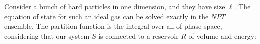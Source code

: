 \documentclass[12pt]{article}
\begin{document}
\newcommand{\pder}[2]{\frac{\partial {#1}}{\partial {#2}}}
\newcommand{\pdert}[2]{\frac{\partial^2 {#1}}{\partial {#2}^2}}
\newcommand{\fder}[2]{\frac{\delta {#1}}{\delta {#2}}}
\newcommand{\PDD}[3]{\left.\frac{\partial^{2}{#1}}{\partial{#2}^{2}}\right|_{#3}
}
\newcommand{\PD}[3]{\left.\frac{\partial{#1}}{\partial{#2}}\right|_{#3}}
\newcommand{\der}[2]{\frac{d {#1}}{d {#2}}}

\renewcommand{\deg}{^\circ}
\newcommand{\com}{{\bf [C] }}
\newcommand{\cend}{\Emark\[\]\vspace*{-1. cm}}
\newcommand{\x}{\times}

\newcommand{\win}{\ddot\smile}
\newcommand{\lose}{\ddot\frown}
\newcommand{\avg}[1]{\left \langle #1 \right \rangle}
\newcommand{\E}[1]{\ensuremath{\times10^{#1}}}
\newcommand{\abs}[1]{\ensuremath{\left | #1 \right |}}
\newcommand{\paren}[1]{\left(#1\right)}
\newcommand{\recip}[1]{\frac{1}{#1}}
\newcommand{\ex}[1]{\mathbb{E}[#1]}
\newcommand{\bprob}[1]{\textbf{#1~---}}
\newcommand{\unitv}[1]{\ensuremath{\mathbf{\hat{e}}_{#1}}}
\newcommand{\goto}{\rightarrow}
\newcommand{\expct}[1]{\mathbb{E}[#1]}
\newcommand{\mtrx}[1]{\begin{matrix}#1\end{matrix}}
\newcommand{\pmtrx}[1]{\paren{\begin{matrix}#1\end{matrix}}}
\newcommand{\cosp}[1]{\cos{\paren{#1}}}
\newcommand{\sinp}[1]{\sin{\paren{#1}}}
\newcommand{\tanp}[1]{\tan{\paren{#1}}}
\newcommand{\half}[1]{\frac{#1}{2}}
\newcommand{\ham}{\mathcal{H}}
\newcommand{\tr}{\mathrm{Tr}}
\newcommand{\bv}[1]{\mathbf{#1}}
\newcommand{\Der}[2]{\frac{d#1}{d#2}}
\renewcommand{\Dot}[2]{\ensuremath{\bv{#1}\cdot\bv{#2}}}
\newcommand{\Cross}[2]{\ensuremath{\bv{#1}\times\bv{#2}}}
\newcommand{\del}{\ensuremath{\partial}}
\newcommand{\R}{\ensuremath{\bv{r-r'}}}
\newcommand{\aR}{\ensuremath{\abs{\R}}}
\newcommand{\br}{\ensuremath{\bv{r}}}
\newcommand{\impl}{\ensuremath{\quad \Rightarrow \quad}}
\renewcommand{\div}[1]{\nabla \cdot \bv{#1}}
\newcommand{\curl}[1]{\nabla \times \bv{#1}}
\newcommand{\lapl}{\nabla^2}
\newcommand{\vint}{\int d^3r}
\newcommand{\oocs}{\recip{c^2}}
\newcommand{\mnfp}[1]{\frac{\mu_0 #1}{4\pi}}
\renewcommand{\iiint}{\int_{-\infty}^{\infty}}
\newcommand{\tpi}[1]{\paren{2\pi}^{#1}}
\newcommand{\ootpi}[1]{\recip{\paren{2\pi}^{#1}}}


Consider a bunch of hard particles in one dimension, and they have size $\ell$. The equation of state for such an ideal gas can be solved exactly in the $NPT$ ensemble. The partition function is the integral over all of phase space, considering that our system $S$ is connected to a reservoir $R$ of volume and energy:
\end{document}
